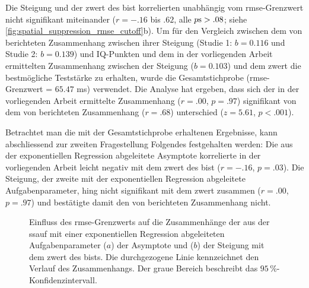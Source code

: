 \documentclass[11pt, twoside, a4paper]{book}		%
\begin{document}
Die Steigung und der \gls{zwert} des \gls{bist} korrelierten unabhängig vom \gls{rmse}-Grenzwert nicht signifikant miteinander ($r=-.16$ bis $.62$, alle $p\textnormal{s}>.08$; siehe \autoref{fig:spatial_suppression_rmse_cutoff}b). 
Um für den Vergleich zwischen dem von \citet{Melnick2013} berichteten Zusammenhang zwischen ihrer Steigung (Studie 1: $b=0.116$ und Studie 2: $b=0.139$) und IQ-Punkten und dem in der vorliegenden Arbeit ermittelten Zusammenhang zwischen der Steigung ($b=0.103$) und dem \gls{zwert} die bestmögliche Teststärke zu erhalten, wurde die Gesamtstichprobe (\gls{rmse}-Grenzwert = $65.47$ ms) verwendet. Die Analyse hat ergeben, dass sich der in der vorliegenden Arbeit ermittelte Zusammenhang ($r=.00$, $p=.97$) signifikant von dem von \citeauthor{Melnick2013} berichteten Zusammenhang ($r=.68$) unterschied ($z=5.61$, $p<.001$).

Betrachtet man die mit der Gesamtstichprobe erhaltenen Ergebnisse, kann abschliessend zur zweiten Fragestellung Folgendes festgehalten werden:  
Die aus der exponentiellen Regression abgeleitete Asymptote korrelierte in der vorliegenden Arbeit leicht negativ mit dem \gls{zwert} des \gls{bist} ($r=-.16$, $p=.03$). Die Steigung, der zweite mit der exponentiellen Regression abgeleitete Aufgabenparameter, hing nicht signifikant mit dem \gls{zwert} zusammen ($r=.00$, $p=.97$) und bestätigte damit den von \citet{Melnick2013} berichteten Zusammenhang nicht. 

\begin{figure}[htbp]
	\centering
	\begin{adjustbox}{width=1\textwidth}
	\end{adjustbox}
	\newline
	\begin{adjustbox}{width=1\textwidth}
	\end{adjustbox}
	
	\caption[RMSE einfluss]{Einfluss des \gls{rmse}-Grenzwerts auf die Zusammenhänge der aus der \gls{ssauf} mit einer exponentiellen Regression abgeleiteten Aufgabenparameter ($a$) der Asymptote  und ($b$) der Steigung  mit dem \gls{zwert} des \gls{bist}s. Die durchgezogene Linie kennzeichnet den Verlauf des Zusammenhangs. Der graue Bereich beschreibt das $95\,\%$-Konfidenzintervall.}
	\label{fig:spatial_suppression_rmse_cutoff}
\end{figure}
\end{document}
